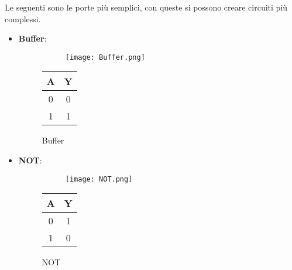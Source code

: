 \documentclass{article}
\begin{document}
Le seguenti sono le porte più semplici, con queste si possono creare circuiti più complessi.

\vspace{10pt}

\begin{itemize}

\item \textbf{Buffer}:

\begin{figure}[ht]
    \begin{minipage}[t]{0.49\textwidth}
        \centering
        \begin{figure}[H]
        \centering
\texttt{[image: Buffer.png]}
        \end{figure}
        \label{fig:buffer}
    \end{minipage}
    \begin{minipage}[t]{0.49\textwidth}
    \centering
        \begin{table}[H]
        \centering
        \begin{tabular}{c|c}
            A & Y\\
            \hline
            0 & 0\\
            \hline
            1 & 1\\
        \end{tabular}
    \label{tab:buffer}
    \end{table}
\end{minipage}
\caption{Buffer}
\end{figure}

\item \textbf{NOT}:

\begin{figure}[ht]
    \begin{minipage}[t]{0.49\textwidth}
        \centering
        \begin{figure}[H]
        \centering
        \texttt{[image: NOT.png]}
        \end{figure}
        \label{fig:not}
    \end{minipage}
    \begin{minipage}[t]{0.49\textwidth}
    \centering
        \begin{table}[H]
        \centering
        \begin{tabular}{c|c}
            A & Y\\
            \hline
            0 & 1\\
            \hline
            1 & 0\\
        \end{tabular}
    \label{tab:not}
    \end{table}
\end{minipage}
\caption{NOT}
\end{figure}


\end{itemize}
\end{document}
